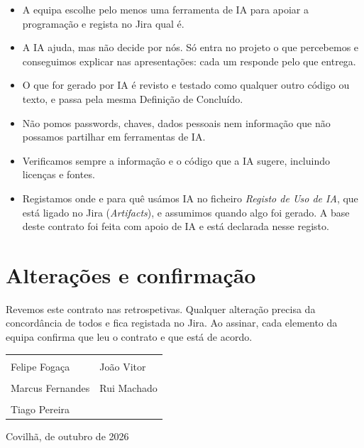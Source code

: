 \documentclass[11pt,a4paper]{article}
\begin{document}
\begin{itemize}
  \item A equipa escolhe pelo menos uma ferramenta de IA para apoiar a programação e regista no Jira qual é.
  \item A IA ajuda, mas não decide por nós. Só entra no projeto o que percebemos e conseguimos explicar nas apresentações: cada um responde pelo que entrega.
  \item O que for gerado por IA é revisto e testado como qualquer outro código ou texto, e passa pela mesma Definição de Concluído.
  \item Não pomos passwords, chaves, dados pessoais nem informação que não possamos partilhar em ferramentas de IA.
  \item Verificamos sempre a informação e o código que a IA sugere, incluindo licenças e fontes.
  \item Registamos onde e para quê usámos IA no ficheiro \textit{Registo de Uso de IA}, que está ligado no Jira (\textit{Artifacts}), e assumimos quando algo foi gerado. A base deste contrato foi feita com apoio de IA e está declarada nesse registo.
\end{itemize}

\section{Alterações e confirmação}

Revemos este contrato nas retrospetivas. Qualquer alteração precisa da concordância de todos e fica registada no Jira. Ao assinar, cada elemento da equipa confirma que leu o contrato e que está de acordo.

\vspace{0.4em}
\begin{tabularx}{\textwidth}{Y@{\hspace{1.4cm}}Y}
  \rule{0pt}{2.6em}\hrulefill & \rule{0pt}{2.6em}\hrulefill \\
  \small Felipe Fogaça & \small João Vitor \\
  \rule{0pt}{2.6em}\hrulefill & \rule{0pt}{2.6em}\hrulefill \\
  \small Marcus Fernandes & \small Rui Machado \\
  \rule{0pt}{2.6em}\hrulefill & \\
  \small Tiago Pereira & \\
\end{tabularx}

\vspace{1.5em}
Covilhã, \underline{\hspace{1cm}} de outubro de 2026
\end{document}
